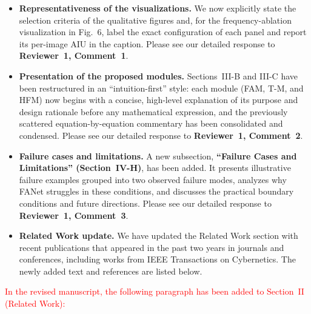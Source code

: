 \documentclass[letterpaper,journal,onecolumn,12pt]{IEEEtran}
\begin{document}
\begin{itemize}
    \item \textbf{Representativeness of the visualizations.}
    We now explicitly state the selection criteria of the qualitative figures and, for the frequency-ablation
    visualization in Fig.~6, label the exact configuration of each panel and report its per-image AIU in the caption.
    Please see our detailed response to \textbf{Reviewer~1, Comment~1}.

    \item \textbf{Presentation of the proposed modules.}
    Sections~III-B and III-C have been restructured in an ``intuition-first'' style: each module (FAM, T-M, and HFM)
    now begins with a concise, high-level explanation of its purpose and design rationale before any mathematical
    expression, and the previously scattered equation-by-equation commentary has been consolidated and condensed.
    Please see our detailed response to \textbf{Reviewer~1, Comment~2}.

    \item \textbf{Failure cases and limitations.}
    A new subsection, \textbf{``Failure Cases and Limitations'' (Section~IV-H)}, has been added. It presents
    illustrative failure examples grouped into two observed failure modes, analyzes why FANet struggles in these
    conditions, and discusses the practical boundary conditions and future directions.
    Please see our detailed response to \textbf{Reviewer~1, Comment~3}.

    \item \textbf{Related Work update.}
    We have updated the Related Work section with recent publications that appeared in the past two years in
    journals and conferences, including works from IEEE Transactions on Cybernetics.
    The newly added text and references are listed below.
\end{itemize}

\textcolor{red}{In the revised manuscript, the following paragraph has been added to Section~II (Related Work):}
\end{document}
